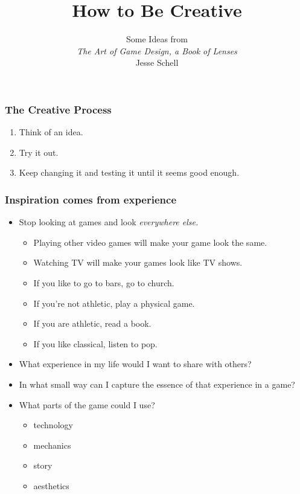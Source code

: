 \documentclass{beamer}
\title{How to Be Creative}
\subtitle{Some Ideas from\\ {\em The Art of Game Design, a
  Book of Lenses}\\ Jesse Schell}
\begin{document}
\begin{frame}[plain]
  \titlepage
\end{frame}

\begin{frame}
  \frametitle{The Creative Process}


\begin{enumerate}
\item Think of an idea.
\item Try it out.
\item Keep changing it and testing it until it seems good enough.
\end{enumerate}

\end{frame}
\begin{frame}
  \frametitle{Inspiration comes from experience}

\begin{itemize}
\item Stop looking at games and look {\em everywhere else.}\pause
\begin{itemize}
\item Playing other video games will make your game look the same.\pause
\item Watching TV will make your games look like TV shows.\pause
\item If you like to go to bars, go to church.\pause
\item If you're not athletic, play a physical game.\pause
\item If you are athletic, read a book.\pause
\item If you like classical, listen to pop.\pause
\end{itemize}
\item What experience in my life would I want to share with
  others?\pause
\item In what small way can I capture the essence of that experience
  in a game?\pause
\item What parts of the game could I use?
\begin{itemize}\item technology\item mechanics\item story\item aesthetics
\end{itemize}

\end{itemize}

\end{frame}
\end{document}
